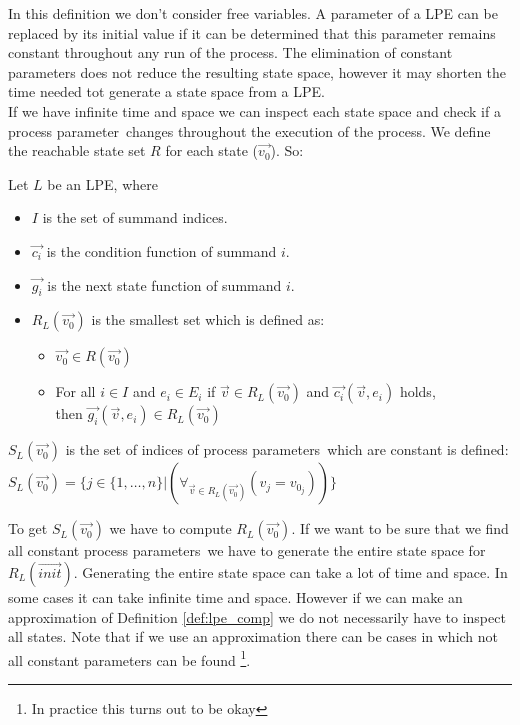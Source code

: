 \documentclass[a4paper,10pt]{article}
\theoremstyle{plain}
\theoremstyle{definition}
\newcommand{\ovr}{\overrightarrow}
\newcommand{\pp}{process parameter}
\newcommand{\pps}{process parameters}
\begin{document}
In this definition we don't consider free variables.
A parameter of a LPE can be replaced by its initial value if it can be determined that this parameter remains constant throughout any run of the process. The elimination of constant parameters does not reduce the resulting state space, however it may shorten the time needed tot generate a state space from a LPE. \\
If we have infinite time and space we can inspect each state space and check if a \pp\ changes throughout the execution of the process. We define the reachable state set $R$ for each state ($\ovr{v_0}$). So:
\begin{defn}\label{def:lpe} Let $L$ be an LPE, where\begin{itemize}
\item $I$ is the set of summand indices.
\item $\ovr{c_i}$ is the condition function of summand $i$.
\item $\ovr{g_i}$ is the next state function of summand $i$.
\item
$R_L(\ovr{v_0})$ is the smallest set which is defined as:
  \begin{itemize}
    \item $\ovr{v_0} \in R(\ovr{v_0})$
    \item For all $i \in I$ and $e_i \in E_i$ if $\ovr{v} \in R_L(\ovr{v_0})$ and $\ovr{c_i}(\ovr{v}, e_i)$ holds, \\ then $\ovr{g_i}(\ovr{v}, e_i) \in R_L(\ovr{v_0})$ \\
   \end{itemize}
\end{itemize}

\end{defn}


\begin{defn}\label{def:lpe_comp}
$S_L(\ovr{v_0})$ is the set of indices of \pps\ which are constant is defined:\\

$S_L(\ovr{v_0}) = \lbrace j \in  \lbrace 1, \ldots, n \rbrace \vert (\forall_{\ovr{v} \in R_L(\ovr{v_0})}( v_j = v_{0_j})) \rbrace $
\end{defn}

To get $S_L(\ovr{v_0})$ we have to compute $R_L(\ovr{v_0})$. If we want to be sure that we find all constant \pps\ we have to generate the entire state space for $R_L(\ovr{init})$. Generating the entire state space can take a lot of time and space. In some cases it can take infinite time and space. However if we can make an approximation of Definition \ref{def:lpe_comp} we do not necessarily have to inspect all states. Note that if we use an approximation there can be cases in which not all constant parameters can be found \footnote{In practice this turns out to be okay}.  
\end{document}
